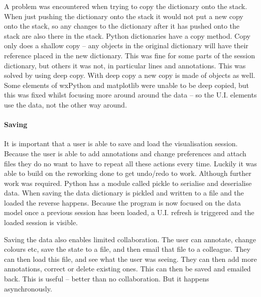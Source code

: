 A problem was encountered when trying to copy the dictionary onto the stack.  When just pushing the dictionary onto the stack it would not put a new copy onto the stack, so any changes to the dictionary after it has pushed onto the stack are also there in the stack.  Python dictionaries have a copy method.  Copy only does a shallow copy -- any objects in the original dictionary will have their reference placed in the new dictionary.  This was fine for some parts of the session dictionary, but others it was not, in particular lines and annotations.  This was solved by using deep copy.  With deep copy a new copy is made of objects as well.  Some elements of wxPython and matplotlib were unable to be deep copied, but this was fixed whilst focusing more around around the data -- so the U.I. elements use the data, not the other way around.

\paragraph{Saving}

It is important that a user is able to save and load the visualisation session.  Because the user is able to add annotations and change preferences and attach files they do no want to have to repeat all these actions every time.  Luckily it was able to build on the reworking done to get undo/redo to work.  Although further work was required. Python has a module called pickle to serialise and deserialise data.  When saving the data dictionary is pickled and written to a file and the loaded the reverse happens.  Because the program is now focused on the data model once a previous session has been loaded, a U.I. refresh is triggered and the loaded session is visible.

Saving the data also enables limited collaboration.  The user can annotate, change colours etc, save the state to a file, and then email that file to a colleague.  They can then load this file, and see what the user was seeing.  They can then add more annotations, correct or delete existing ones.  This can then be saved and emailed back.  This is useful -- better than no collaboration.  But it happens asynchronously.

